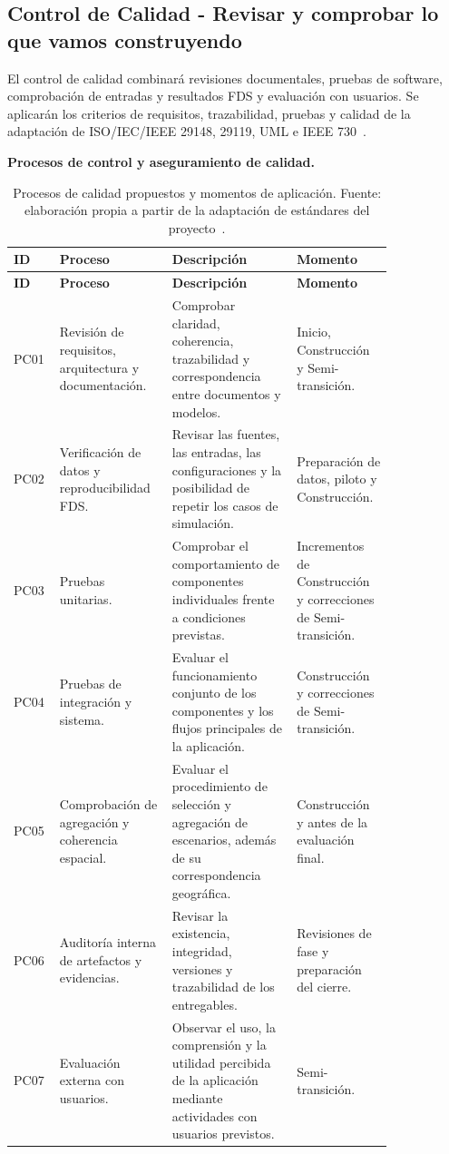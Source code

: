 
\subsection{Control de Calidad - Revisar y comprobar lo que vamos construyendo}\label{sec:spmp-12-5}

El control de calidad combinará revisiones documentales, pruebas de software, comprobación de entradas y resultados FDS y evaluación con usuarios. Se aplicarán los criterios de requisitos, trazabilidad, pruebas y calidad de la adaptación de ISO/IEC/IEEE 29148, 29119, UML e IEEE 730~\cite{ieee730,std29148,uml,std29119p2,std29119p3,std29119p4,adaptacion2026}.

\textbf{Procesos de control y aseguramiento de calidad.}

\begin{longtable}{|p{0.08\linewidth}|p{0.25\linewidth}|p{0.30\linewidth}|p{0.20\linewidth}|}
\caption{Procesos de calidad propuestos y momentos de aplicación. Fuente: elaboración propia a partir de la adaptación de estándares del proyecto~\cite{adaptacion2026}.}\\
\hline
\textbf{ID} & \textbf{Proceso} & \textbf{Descripción} & \textbf{Momento}\\\hline
\endfirsthead
\hline
\textbf{ID} & \textbf{Proceso} & \textbf{Descripción} & \textbf{Momento}\\\hline
\endhead
PC01 & Revisión de requisitos, arquitectura y documentación. & Comprobar claridad, coherencia, trazabilidad y correspondencia entre documentos y modelos. & Inicio, Construcción y Semi-transición.\\\hline
PC02 & Verificación de datos y reproducibilidad FDS. & Revisar las fuentes, las entradas, las configuraciones y la posibilidad de repetir los casos de simulación. & Preparación de datos, piloto y Construcción.\\\hline
PC03 & Pruebas unitarias. & Comprobar el comportamiento de componentes individuales frente a condiciones previstas. & Incrementos de Construcción y correcciones de Semi-transición.\\\hline
PC04 & Pruebas de integración y sistema. & Evaluar el funcionamiento conjunto de los componentes y los flujos principales de la aplicación. & Construcción y correcciones de Semi-transición.\\\hline
PC05 & Comprobación de agregación y coherencia espacial. & Evaluar el procedimiento de selección y agregación de escenarios, además de su correspondencia geográfica. & Construcción y antes de la evaluación final.\\\hline
PC06 & Auditoría interna de artefactos y evidencias. & Revisar la existencia, integridad, versiones y trazabilidad de los entregables. & Revisiones de fase y preparación del cierre.\\\hline
PC07 & Evaluación externa con usuarios. & Observar el uso, la comprensión y la utilidad percibida de la aplicación mediante actividades con usuarios previstos. & Semi-transición.\\\hline
\end{longtable}

